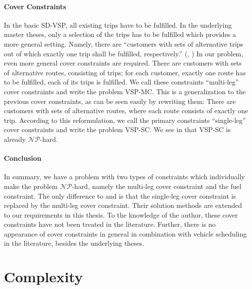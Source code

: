 \paragraph{Cover Constraints} \parfill

In the basic SD-VSP, all existing trips have to be fulfilled. In the underlying master theses, only a selection of the trips has to be fulfilled which provides a more general setting. Namely, there are \enquote{customers with sets of alternative trips out of which exactly one trip shall be fulfilled, respectively.} (\cite[p.~10]{Kaiser}, \cite[p.~10]{Knoll}) In our problem, even more general cover constraints are required. There are customers with sets of alternative routes, consisting of trips; for each customer, exactly one route has to be fulfilled, \ie each of its trips is fulfilled. We call these constraints \enquote{multi-leg} cover constraints and write the problem VSP-MC. This is a generalization to the previous cover constraints, as can be seen easily by rewriting them: There are customers with sets of alternative routes, where each route consists of exactly one trip. According to this reformulation, we call the primary constraints \enquote{single-leg} cover constraints and write the problem VSP-SC. We see in  that VSP-SC is already $\mathcal{NP}$-hard.

\newpage

\paragraph{Conclusion} \parfill

In summary, we have a problem with two types of constraints which individually make the problem $\mathcal{NP}$-hard, namely the multi-leg cover constraint and the fuel constraint. The only difference to \cite{Kaiser} and \cite{Knoll} is that the single-leg cover constraint is replaced by the multi-leg cover constraint. Their solution methods are extended to our requirements in this thesis. To the knowledge of the author, these cover constraints have not been treated in the literature. Further, there is no appearance of cover constraints in general in combination with vehicle scheduling in the literature, besides the underlying theses. 


\section{Complexity}
\label{sec:complexity}

